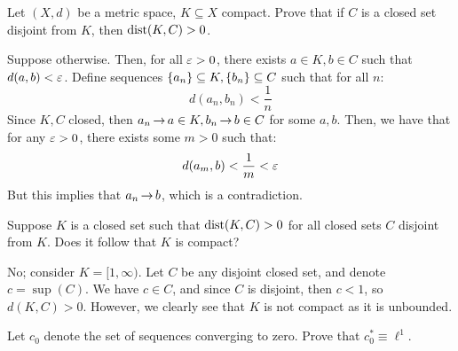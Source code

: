 \newpage
\label{q21}
\begin{qu}[num=21.1]
    Let $ (X, d) $ be a metric space, $ K \subseteq X $ compact.
    Prove that if $ C $ is a closed set disjoint from $ K $, then $ \operatorname{dist}(K, C)
    > 0 $.
\end{qu}

\begin{soln}
    Suppose otherwise. Then, for all $ \operatorname{\varepsilon} > 0 $, there exists $ a \in K, b \in
    C $ such that $ d(a,b) < \operatorname{\varepsilon} $. Define sequences $ \left\{{a_{n}}\right\} \subseteq K,
    \left\{{b_{n}}\right\} \subseteq C $ such that for all $ n $:
    \begin{equation*}
        d(a_{n},b_{n}) < \frac{1}{n}
    \end{equation*}
    Since $ K, C $ closed, then $ a_{n} \operatorname{\rightarrow} a \in K, b_{n} \operatorname{\rightarrow} b \in C $ for
    some $ a, b $. Then, we have that for any $ \operatorname{\varepsilon} > 0 $, there exists some
    $ m > 0 $ such that:
    \begin{equation*}
        d(a_{m}, b) < \frac{1}{m} < \operatorname{\varepsilon}
    \end{equation*}
    But this implies that $ a_{n}\operatorname{\rightarrow} b $, which is a contradiction.
\end{soln}

\begin{qu}[num=21.2]
    Suppose $ K $ is a closed set such that $ \operatorname{dist}(K, C) > 0 $ for all closed
    sets $ C $ disjoint from $ K $. Does it follow that $ K $ is compact?
\end{qu}

\begin{soln}
    No; consider $ K = [1, \infty) $. Let $ C $ be any disjoint closed set, and
    denote $ c = \sup(C) $. We have $ c \in C $, and since $ C $ is disjoint,
    then $ c < 1 $, so $ d(K, C) > 0 $. However, we clearly see that $ K $ is not
    compact as it is unbounded.
\end{soln}


\newpage
\label{q22}
\begin{qu}[num=22]
    Let $ c_{0} $ denote the set of sequences converging to zero.
    Prove that $ c_{0}^{*} \equiv \ell^{1} $.
\end{qu}

